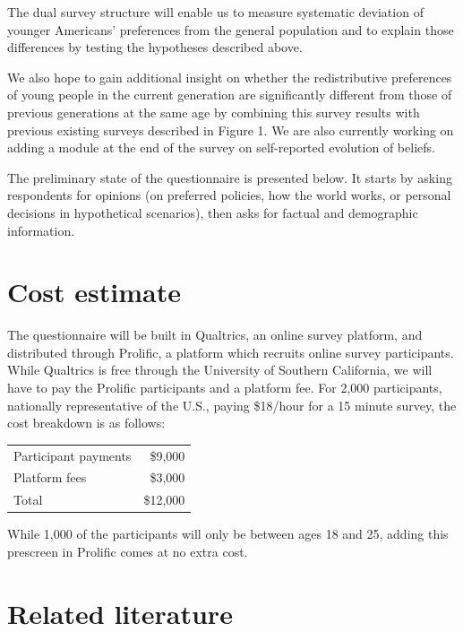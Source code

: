 \documentclass[11pt, headsepline]{article}
\begin{document}
The dual survey structure will enable us to measure systematic deviation of younger Americans' preferences from the general population and to explain those differences by testing the hypotheses described above. 

We also hope to gain additional insight on whether the redistributive preferences of young people in the current generation are significantly different from those of previous generations at the same age by combining this survey results with previous existing surveys described in Figure 1. We are also currently working on adding a module at the end of the survey on self-reported evolution of beliefs.

The preliminary state of the questionnaire  is presented below. It starts by asking respondents for opinions (on preferred policies, how the world works, or personal decisions in hypothetical scenarios), then asks for factual and demographic information.

\section*{Cost estimate}

The questionnaire will be built in Qualtrics, an online survey platform, and distributed through Prolific, a platform which recruits online survey participants. While Qualtrics is free through the University of Southern California, we will have to pay the Prolific participants and a platform fee. For 2,000 participants, nationally representative of the U.S., paying \$18/hour for a 15 minute survey, the cost breakdown is as follows:
\begin{center}
\begin{tabular}{l r} 
    Participant payments & \$9,000 \\
    Platform fees & \$3,000 \\
    \hline Total & \$12,000
\end{tabular}
\end{center}
While 1,000 of the participants will only be between ages 18 and 25, adding this prescreen in Prolific comes at no extra cost.

\section*{Related literature}
\end{document}
